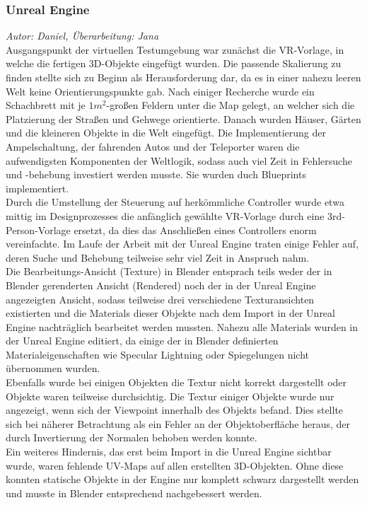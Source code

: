 \documentclass{Bericht}
\begin{document}
\subsubsection{Unreal Engine}
\textit{Autor: Daniel, Überarbeitung: Jana}\\
Ausgangspunkt der virtuellen Testumgebung war zunächst die VR-Vorlage, in welche die fertigen 3D-Objekte eingefügt wurden. Die passende Skalierung zu finden stellte sich zu Beginn als Herausforderung dar, da es in einer nahezu leeren Welt keine Orientierungspunkte gab. Nach einiger Recherche wurde ein Schachbrett mit je $1m^{2}$-großen Feldern unter die Map gelegt, an welcher sich die Platzierung der Straßen und Gehwege orientierte. Danach wurden Häuser, Gärten und die kleineren Objekte in die Welt eingefügt.
Die Implementierung der Ampelschaltung, der fahrenden Autos und der Teleporter waren die aufwendigsten Komponenten der Weltlogik, sodass auch viel Zeit in Fehlersuche und -behebung investiert werden musste. Sie wurden duch Blueprints implementiert.\\
		Durch die Umstellung der Steuerung auf herkömmliche Controller wurde etwa mittig im Designprozesses die anfänglich gewählte VR-Vorlage durch eine 3rd-Person-Vorlage ersetzt, da dies das Anschließen eines Controllers enorm vereinfachte.
		Im Laufe der Arbeit mit der Unreal Engine traten einige Fehler auf, deren Suche und Behebung teilweise sehr viel Zeit in Anspruch nahm.\\
Die Bearbeitungs-Ansicht (Texture) in Blender entsprach teils weder der in Blender gerenderten Ansicht (Rendered) noch der in der Unreal Engine angezeigten Ansicht, sodass teilweise drei verschiedene Texturansichten existierten und die Materials dieser Objekte nach dem Import in der Unreal Engine nachträglich bearbeitet werden mussten. Nahezu alle Materials wurden in der Unreal Engine editiert, da einige der in Blender definierten Materialeigenschaften wie Specular Lightning oder Spiegelungen nicht übernommen wurden.\\
Ebenfalls wurde bei einigen Objekten die Textur nicht korrekt dargestellt oder Objekte waren teilweise durchsichtig. 
Die Textur einiger Objekte wurde nur angezeigt, wenn sich der Viewpoint innerhalb des Objekts befand. Dies stellte sich bei näherer Betrachtung als ein Fehler an der Objektoberfläche heraus, der durch Invertierung der Normalen behoben werden konnte.\\
Ein weiteres Hindernis, das erst beim Import in die Unreal Engine sichtbar wurde, waren fehlende UV-Maps auf allen erstellten 3D-Objekten. Ohne diese konnten statische Objekte in der Engine nur komplett schwarz dargestellt werden und musste in Blender entsprechend nachgebessert werden. 
\end{document}
